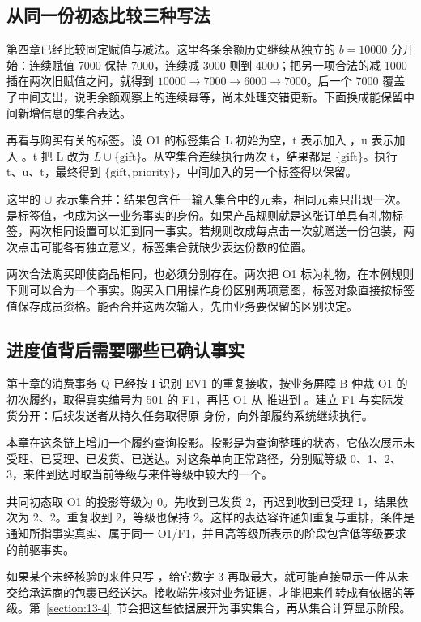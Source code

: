 \subsection*{从同一份初态比较三种写法}

第四章已经比较固定赋值与减法。这里各条余额历史继续从独立的 $b=10000$ 分开始：连续赋值 7000 保持 7000，连续减 3000 则到 4000；把另一项合法的减 1000 插在两次旧赋值之间，就得到 $10000\to7000\to6000\to7000$。后一个 7000 覆盖了中间支出，说明余额观察上的连续幂等，尚未处理交错更新。下面换成能保留中间新增信息的集合表达。

再看与购买有关的标签。设 O1 的标签集合 L 初始为空，t 表示加入 ，u 表示加入 。t 把 L 改为 $L\cup\{\mathrm{gift}\}$。从空集合连续执行两次 t，结果都是 $\{\mathrm{gift}\}$。执行 t、u、t，最终得到 $\{\mathrm{gift},\mathrm{priority}\}$，中间加入的另一个标签得以保留。

这里的 $\cup$ 表示集合并：结果包含任一输入集合中的元素，相同元素只出现一次。 是标签值，也成为这一业务事实的身份。如果产品规则就是这张订单具有礼物标签，两次相同设置可以汇到同一事实。若规则改成每点击一次就赠送一份包装，两次点击可能各有独立意义，标签集合就缺少表达份数的位置。

两次合法购买即使商品相同，也必须分别存在。两次把 O1 标为礼物，在本例规则下则可以合为一个事实。购买入口用操作身份区别两项意图，标签对象直接按标签值保存成员资格。能否合并这两次输入，先由业务要保留的区别决定。

\subsection*{进度值背后需要哪些已确认事实}

第十章的消费事务 Q 已经按 I 识别 EV1 的重复接收，按业务屏障 B 仲裁 O1 的初次履约，取得真实编号为 501 的 F1，再把 O1 从  推进到 。建立 F1 与实际发货分开：后续发送者从持久任务取得原  身份，向外部履约系统继续执行。

本章在这条链上增加一个履约查询投影。投影是为查询整理的状态，它依次展示未受理、已受理、已发货、已送达。对这条单向正常路径，分别赋等级 0、1、2、3，来件到达时取当前等级与来件等级中较大的一个。

共同初态取 O1 的投影等级为 0。先收到已发货 2，再迟到收到已受理 1，结果依次为 2、2。重复收到 2，等级也保持 2。这样的表达容许通知重复与重排，条件是通知所指事实真实、属于同一 O1/F1，并且高等级所表示的阶段包含低等级要求的前驱事实。

如果某个未经核验的来件只写 ，给它数字 3 再取最大，就可能直接显示一件从未交给承运商的包裹已经送达。接收端先核对业务证据，才能把来件转成有依据的等级。第~\ref{section:13-4}~节会把这些依据展开为事实集合，再从集合计算显示阶段。

